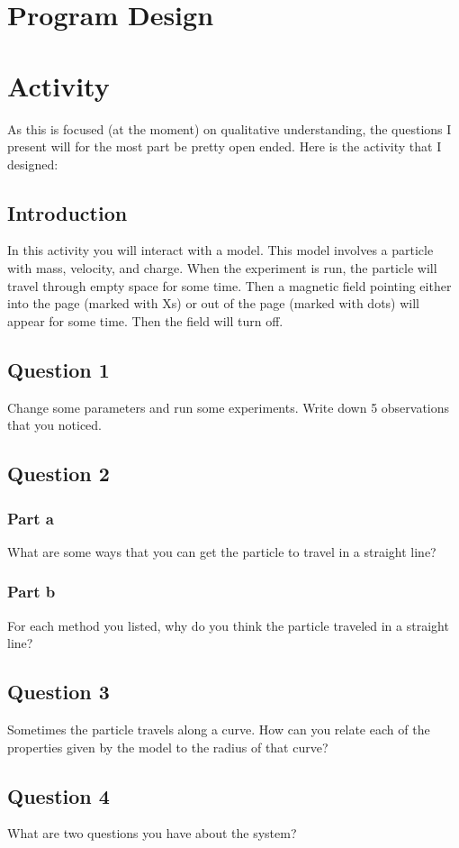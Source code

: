 \documentclass[11pt]{article}
\begin{document}
   	    \section*{Program Design}
   	    
   	    \section*{Activity}
   	    
   	    As this is focused (at the moment) on qualitative understanding, the questions I present will for the most part be pretty open ended. Here is the activity that I designed:
   	    
   	    \subsection*{Introduction}
   	    
   	    	In this activity you will interact with a model. This model involves a particle with mass, velocity, and charge. When the experiment is run, the particle will travel through empty space for some time. Then a magnetic field pointing either into the page (marked with Xs) or out of the page (marked with dots) will appear for some time. Then the field will turn off.
   	    
   	    \subsection*{Question 1}
			Change some parameters and run some experiments. Write down 5 observations that you noticed.
			
		\subsection*{Question 2}
			\subsubsection*{Part a}
				What are some ways that you can get the particle to travel in a straight line?
				
			\subsubsection*{Part b}
				For each method you listed, why do you think the particle traveled in a straight line?
			
		\subsection*{Question 3}
			Sometimes the particle travels along a curve. How can you relate each of the properties given by the model to the radius of that curve?
			
		\subsection*{Question 4}
			What are two questions you have about the system?
\end{document}
